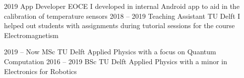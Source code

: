 \documentclass[9pt]{developercv} %
\begin{document}
\vspace{0.5cm}



\begin{minipage}[t]{1\textwidth} %
	\vspace{-\baselineskip} %

	

\end{minipage}



\begin{entrylist}
	\entry
		{2019}
		{App Developer}
		{EOCE}
		{I developed in internal Android app to aid in the calibration of temperature sensors}
	\entry
		{2018 -- 2019}
		{Teaching Assistant}
		{TU Delft}
		{I helped out students with assignments during tutorial sessions for the course Electromagnetism}
\end{entrylist}



\begin{entrylist}
	\entry
		{2019 -- Now}
		{MSc}
		{TU Delft}
		{Applied Physics with a focus on Quantum Computation}
	\entry
		{2016 -- 2019}
		{BSc}
		{TU Delft}
		{Applied Physics with a minor in Electronics for Robotics}
\end{entrylist}

\end{document}

